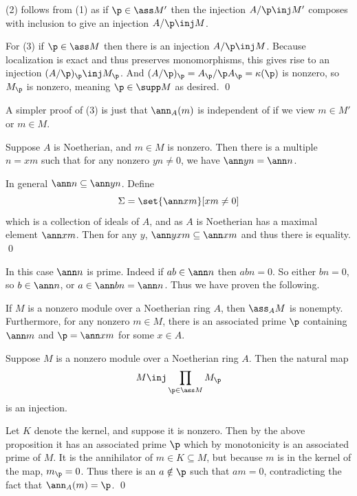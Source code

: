     (2) follows from (1) as if $\p\in\ass M'$ then the injection $A/\p\inj M'$ composes with inclusion to give an injection $A/\p\inj M$.

    For (3) if $\p\in\ass M$ then there is an injection $A/\p\inj M$.
    Because localization is exact and thus preserves monomorphisms, this gives rise to an injection $(A/\p)_\p\inj M_\p$.
    And $(A/\p)_\p=A_\p/\p A_\p=\kappa(\p)$ is nonzero, so $M_\p$ is nonzero, meaning $\p\in\supp M$ as desired.
    \qed

\eproof

A simpler proof of (3) is just that $\ann_A(m)$ is independent of if we view $m\in M'$ or $m\in M$.

\blemm

    Suppose $A$ is Noetherian, and $m\in M$ is nonzero.
    Then there is a multiple $n=xm$ such that for any nonzero $yn\neq0$, we have $\ann yn=\ann n$.

\elemm

\bproof

    In general $\ann n\subseteq\ann yn$.
    Define
    $$ \Sigma = \set{\ann xm}[xm\neq0] $$
    which is a collection of ideals of $A$, and as $A$ is Noetherian has a maximal element $\ann xm$.
    Then for any $y$, $\ann yxm\subseteq\ann xm$ and thus there is equality.
    \qed

\eproof

In this case $\ann n$ is prime.
Indeed if $ab\in\ann n$ then $abn=0$.
So either $bn=0$, so $b\in\ann n$, or $a\in\ann bn=\ann n$.
Thus we have proven the following.

\bprop[name={assprimenoether}]

    If $M$ is a nonzero module over a Noetherian ring $A$, then $\ass_AM$ is nonempty.
    Furthermore, for any nonzero $m\in M$, there is an associated prime $\p$ containing $\ann m$ and $\p=\ann xm$ for some $x\in A$.

\eprop

\bprop[name={natinjasspt}]

    Suppose $M$ is a nonzero module over a Noetherian ring $A$.
    Then the natural map
    $$ M \inj \prod_{\p\in\ass M}M_\p $$
    is an injection.

\eprop

\bproof

    Let $K$ denote the kernel, and suppose it is nonzero.
    Then by the above proposition it has an associated prime $\p$ which by monotonicity is an associated prime of $M$.
    It is the annihilator of $m\in K\subseteq M$, but because $m$ is in the kernel of the map, $m_\p=0$.
    Thus there is an $a\notin\p$ such that $am=0$, contradicting the fact that $\ann_A(m)=\p$.
    \qed

